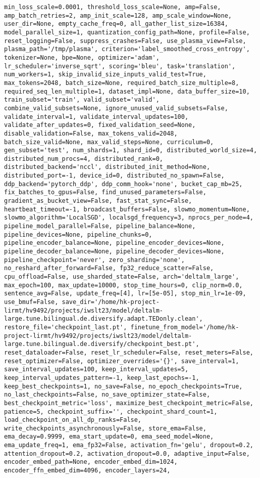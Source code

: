 {{{{{{{{{{{{\begin{verbatim}
min_loss_scale=0.0001, threshold_loss_scale=None, amp=False, amp_batch_retries=2, amp_init_scale=128, amp_scale_window=None, user_dir=None, empty_cache_freq=0, all_gather_list_size=16384, model_parallel_size=1, quantization_config_path=None, profile=False, reset_logging=False, suppress_crashes=False, use_plasma_view=False, plasma_path='/tmp/plasma', criterion='label_smoothed_cross_entropy', tokenizer=None, bpe=None, optimizer='adam', lr_scheduler='inverse_sqrt', scoring='bleu', task='translation', num_workers=1, skip_invalid_size_inputs_valid_test=True, max_tokens=2048, batch_size=None, required_batch_size_multiple=8, required_seq_len_multiple=1, dataset_impl=None, data_buffer_size=10, train_subset='train', valid_subset='valid', combine_valid_subsets=None, ignore_unused_valid_subsets=False, validate_interval=1, validate_interval_updates=100, validate_after_updates=0, fixed_validation_seed=None, disable_validation=False, max_tokens_valid=2048, batch_size_valid=None, max_valid_steps=None, curriculum=0, gen_subset='test', num_shards=1, shard_id=0, distributed_world_size=4, distributed_num_procs=4, distributed_rank=0, distributed_backend='nccl', distributed_init_method=None, distributed_port=-1, device_id=0, distributed_no_spawn=False, ddp_backend='pytorch_ddp', ddp_comm_hook='none', bucket_cap_mb=25, fix_batches_to_gpus=False, find_unused_parameters=False, gradient_as_bucket_view=False, fast_stat_sync=False, heartbeat_timeout=-1, broadcast_buffers=False, slowmo_momentum=None, slowmo_algorithm='LocalSGD', localsgd_frequency=3, nprocs_per_node=4, pipeline_model_parallel=False, pipeline_balance=None, pipeline_devices=None, pipeline_chunks=0, pipeline_encoder_balance=None, pipeline_encoder_devices=None, pipeline_decoder_balance=None, pipeline_decoder_devices=None, pipeline_checkpoint='never', zero_sharding='none', no_reshard_after_forward=False, fp32_reduce_scatter=False, cpu_offload=False, use_sharded_state=False, arch='deltalm_large', max_epoch=100, max_update=10000, stop_time_hours=0, clip_norm=0.0, sentence_avg=False, update_freq=[4], lr=[5e-05], stop_min_lr=1e-09, use_bmuf=False, save_dir='/home/hk-project-lirmt/hv9492/projects/iwslt23/model/deltalm-large.tune.bilingual.de.diversify.adapt.TEDonly.clean', restore_file='checkpoint_last.pt', finetune_from_model='/home/hk-project-lirmt/hv9492/projects/iwslt23/model/deltalm-large.tune.bilingual.de.diversify/checkpoint_best.pt', reset_dataloader=False, reset_lr_scheduler=False, reset_meters=False, reset_optimizer=False, optimizer_overrides='{}', save_interval=1, save_interval_updates=100, keep_interval_updates=5, keep_interval_updates_pattern=-1, keep_last_epochs=-1, keep_best_checkpoints=1, no_save=False, no_epoch_checkpoints=True, no_last_checkpoints=False, no_save_optimizer_state=False, best_checkpoint_metric='loss', maximize_best_checkpoint_metric=False, patience=5, checkpoint_suffix='', checkpoint_shard_count=1, load_checkpoint_on_all_dp_ranks=False, write_checkpoints_asynchronously=False, store_ema=False, ema_decay=0.9999, ema_start_update=0, ema_seed_model=None, ema_update_freq=1, ema_fp32=False, activation_fn='gelu', dropout=0.2, attention_dropout=0.2, activation_dropout=0.0, adaptive_input=False, encoder_embed_path=None, encoder_embed_dim=1024, encoder_ffn_embed_dim=4096, encoder_layers=24, 
\end{verbatim}}}}}}}}}}}}}
